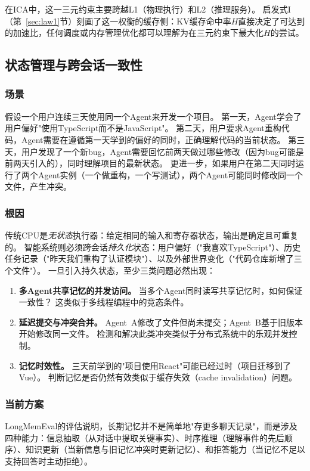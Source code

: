 在ICA中，这一三元约束主要跨越L1（物理执行）和L2（推理服务）。
启发式I（第~\ref{sec:law1}节）刻画了这一权衡的缓存侧：KV缓存命中率$H$直接决定了可达到的加速比，任何调度或内存管理优化都可以理解为在三元约束下最大化$H$的尝试。


\subsection{状态管理与跨会话一致性}

\subsubsection{场景}
假设一个用户连续三天使用同一个Agent来开发一个项目。
第一天，Agent学会了用户偏好"使用TypeScript而不是JavaScript"。
第二天，用户要求Agent重构代码，Agent需要在遵循第一天学到的偏好的同时，正确理解代码的当前状态。
第三天，用户发现了一个新bug，Agent需要回忆前两天做过哪些修改（因为bug可能是前两天引入的），同时理解项目的最新状态。
更进一步，如果用户在第二天同时运行了两个Agent实例（一个做重构，一个写测试），两个Agent可能同时修改同一个文件，产生冲突。

\subsubsection{根因}
传统CPU是\emph{无状态}执行器：给定相同的输入和寄存器状态，输出是确定且可重复的。
智能系统则必须跨会话\emph{持久化}状态：用户偏好（"我喜欢TypeScript"）、历史任务记录（"昨天我们重构了认证模块"）、以及外部世界变化（"代码仓库新增了三个文件"）。
一旦引入持久状态，至少三类问题必然出现：

\begin{enumerate}[nosep]
\item \textbf{多Agent共享记忆的并发访问。}
当多个Agent同时读写共享记忆时，如何保证一致性？
这类似于多线程编程中的竞态条件。

\item \textbf{延迟提交与冲突合并。}
Agent~A修改了文件但尚未提交；Agent~B基于旧版本开始修改同一文件。
检测和解决此类冲突类似于分布式系统中的乐观并发控制。

\item \textbf{记忆时效性。}
三天前学到的"项目使用React"可能已经过时（项目迁移到了Vue）。
判断记忆是否仍然有效类似于缓存失效（cache invalidation）问题。
\end{enumerate}

\subsubsection{当前方案}
LongMemEval\cite{longmemeval2024}的评估说明，长期记忆并不是简单地"存更多聊天记录"，而是涉及四种能力：信息抽取（从对话中提取关键事实）、时序推理（理解事件的先后顺序）、知识更新（当新信息与旧记忆冲突时更新记忆）、和拒答能力（当记忆不足以支持回答时主动拒绝）。

